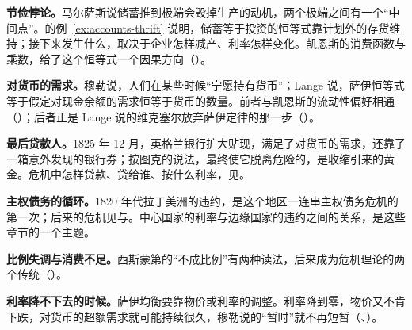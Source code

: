 \textbf{节俭悖论。}马尔萨斯说储蓄推到极端会毁掉生产的动机，两个极端之间有一个“中间点”。的例~\ref{ex:accounts-thrift} 说明，储蓄等于投资的恒等式靠计划外的存货维持；接下来发生什么，取决于企业怎样减产、利率怎样变化。凯恩斯的消费函数与乘数，给了这个恒等式一个因果方向（）。

\textbf{对货币的需求。}穆勒说，人们在某些时候“宁愿持有货币”；Lange 说，萨伊恒等式等于假定对现金余额的需求恒等于货币的数量。前者与凯恩斯的流动性偏好相通（）；后者正是 Lange 说的维克塞尔放弃萨伊定律的那一步（）。

\textbf{最后贷款人。}1825 年 12 月，英格兰银行扩大贴现，满足了对货币的需求，还靠了一箱意外发现的银行券；按图克的说法，最终使它脱离危险的，是收缩引来的黄金。危机中怎样贷款、贷给谁、按什么利率，见。

\textbf{主权债务的循环。}1820 年代拉丁美洲的违约，是这个地区一连串主权债务危机的第一次；后来的危机见与。中心国家的利率与边缘国家的违约之间的关系，是这些章节的一个主题。

\textbf{比例失调与消费不足。}西斯蒙第的“不成比例”有两种读法，后来成为危机理论的两个传统（）。

\textbf{利率降不下去的时候。}萨伊均衡要靠物价或利率的调整。利率降到零，物价又不肯下跌，对货币的超额需求就可能持续很久，穆勒说的“暂时”就不再短暂（、）。

